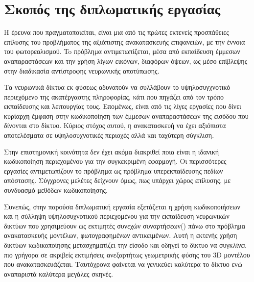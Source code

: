 \section{Σκοπός της διπλωματικής εργασίας}
\label{section:Contribution}

Η έρευνα που πραγματοποιείται, είναι μια από τις πρώτες εκτενείς προσπάθειες επίλυσης του προβλήματος της αξιόπιστης ανακατασκευής  επιφανειών, με την έννοια του φωτορεαλισμού. To πρόβλημα αντιμετωπίζεται, μέσα από εκπαίδευση έμμεσων αναπαραστάσεων και την χρήση λίγων εικόνων, διαφόρων όψεων, ως μέσο επίβλεψης στην διαδικασία αντίστροφης νευρωνικής αποτύπωσης.

Τα νευρωνικά δίκτυα εκ φύσεως αδυνατούν να συλλάβουν το υψηλοσυγχνοτικό περιεχόμενο της ακατέργαστης πληροφορίας, κάτι που πηγάζει από τον τρόπο εκπαίδευσης και λειτουργίας τους. Επομένως, είναι από τις λίγες εργασίες που δίνει κυρίαρχη έμφαση στην κωδικοποίηση των έμμεσων αναπαραστάσεων της εισόδου που δίνονται στο δίκτυο. Κύριος στόχος αυτού, η ανακατασκευή να έχει αξιόπιστα αποτελέσματα σε υψηλοσυχνοτικές περιοχές αλλά και ταχύτερη σύγκλιση. 

Στην επιστημονική κοινότητα δεν έχει ακόμα διακριθεί ποια είναι η ιδανική κωδικοποίηση περιεχομένου για την συγκεκριμένη εφαρμογή. Οι περισσότερες εργασίες αντιμετωπίζουν το πρόβλημα ως πρόβλημα υπερεκπαίδευσης πεδίων απόστασης. Σύγχρονες μελέτες δείχνουν όμως, πως υπάρχει χώρος επίλυσης, με συνδυασμό μεθόδων κωδικοποίησης.

Συνεπώς, στην παρούσα διπλωματική εργασία εξετάζεται η χρήση κωδικοποιήσεων και η σύλληψη υψηλοσυχνοτικού περιεχομένου για την εκπαίδευση νευρωνικών δικτύων που χρησιμεύουν ως εκτιμητές συνεχών συναρτήσεων() πάνω στο πρόβλημα  ανακατασκευής μοντέλων, φωτογραφημένων αντικειμένων. Αυτή η εκτενής χρήση δικτύων κωδικοποίησης μετασχηματίζει την είσοδο και οδηγεί το δίκτυο να συγκλίνει πιο γρήγορα σε ακριβείς εκτιμήσεις ανεξαρτήτως γεωμετρικής φύσης του 3D μοντέλου που ανακατασκευάζεται. Ταυτόχρονα φαίνεται να γενικεύει καλύτερα το δίκτυο ενώ αναπαριστά καλύτερα μεγάλες σκηνές.

